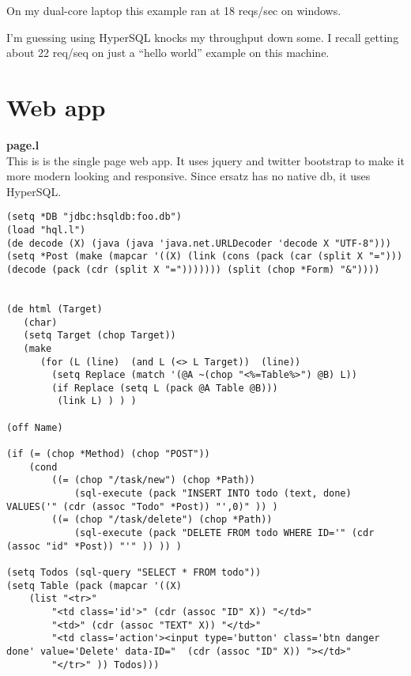 \documentclass[10pt,a4paper]{article}
\begin{document}
On my dual-core laptop this example ran at 18 reqs/sec on windows.

I'm guessing using HyperSQL knocks my throughput down some. I recall getting about 22 req/seq on just a ``hello world'' example on this machine.


\section*{Web app}

\textbf{page.l}
\\
This is is the single page web app. It uses jquery and twitter bootstrap to make it more modern looking and responsive. Since ersatz has no native db, it uses HyperSQL.

\begin{verbatim}
(setq *DB "jdbc:hsqldb:foo.db")
(load "hql.l")
(de decode (X) (java (java 'java.net.URLDecoder 'decode X "UTF-8")))
(setq *Post (make (mapcar '((X) (link (cons (pack (car (split X "="))) (decode (pack (cdr (split X "="))))))) (split (chop *Form) "&"))))


(de html (Target)
   (char)
   (setq Target (chop Target))
   (make
      (for (L (line)  (and L (<> L Target))  (line))
		(setq Replace (match '(@A ~(chop "<%=Table%>") @B) L))
		(if Replace (setq L (pack @A Table @B)))
         (link L) ) ) )

(off Name)

(if (= (chop *Method) (chop "POST"))
	(cond
		((= (chop "/task/new") (chop *Path))
			(sql-execute (pack "INSERT INTO todo (text, done) VALUES('" (cdr (assoc "Todo" *Post)) "',0)" )) )
		((= (chop "/task/delete") (chop *Path))
			(sql-execute (pack "DELETE FROM todo WHERE ID='" (cdr (assoc "id" *Post)) "'" )) )) )

(setq Todos (sql-query "SELECT * FROM todo"))
(setq Table (pack (mapcar '((X)
	(list "<tr>"
		"<td class='id'>" (cdr (assoc "ID" X)) "</td>"
		"<td>" (cdr (assoc "TEXT" X)) "</td>"
		"<td class='action'><input type='button' class='btn danger done' value='Delete' data-ID="  (cdr (assoc "ID" X)) "></td>"
		"</tr>" )) Todos)))


\end{verbatim}
\end{document}
